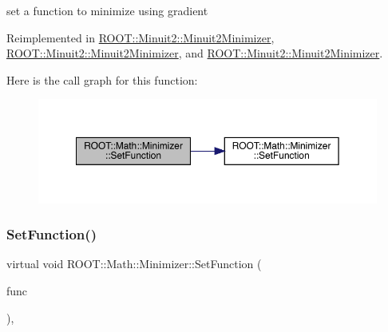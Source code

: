 set a function to minimize using gradient 



Reimplemented in \mbox{\hyperlink{classROOT_1_1Minuit2_1_1Minuit2Minimizer_aeb98c40cf3486fe8fb9bec4da0f7942e}{R\+O\+O\+T\+::\+Minuit2\+::\+Minuit2\+Minimizer}}, \mbox{\hyperlink{classROOT_1_1Minuit2_1_1Minuit2Minimizer_aeb98c40cf3486fe8fb9bec4da0f7942e}{R\+O\+O\+T\+::\+Minuit2\+::\+Minuit2\+Minimizer}}, and \mbox{\hyperlink{classROOT_1_1Minuit2_1_1Minuit2Minimizer_aeb98c40cf3486fe8fb9bec4da0f7942e}{R\+O\+O\+T\+::\+Minuit2\+::\+Minuit2\+Minimizer}}.

Here is the call graph for this function\+:
\nopagebreak
\begin{figure}[H]
\begin{center}
\leavevmode
\includegraphics[width=350pt]{dc/dc4/classROOT_1_1Math_1_1Minimizer_a1d9ff15aa732e518a60a05dcbd82c34a_cgraph}
\end{center}
\end{figure}
\mbox{\label{classROOT_1_1Math_1_1Minimizer_a1d9ff15aa732e518a60a05dcbd82c34a}} 
\subsubsection{\texorpdfstring{SetFunction()}{SetFunction()}\hspace{0.1cm}{\footnotesize\ttfamily [6/6]}}
{\footnotesize\ttfamily virtual void R\+O\+O\+T\+::\+Math\+::\+Minimizer\+::\+Set\+Function (\begin{DoxyParamCaption}\item[{const \mbox{\hyperlink{namespaceROOT_1_1Math_a014e019aaf9304a00e9231bd9ed232fb}{R\+O\+O\+T\+::\+Math\+::\+I\+Multi\+Grad\+Function}} \&}]{func }\end{DoxyParamCaption})\hspace{0.3cm}{\ttfamily [inline]}, {\ttfamily [virtual]}}



